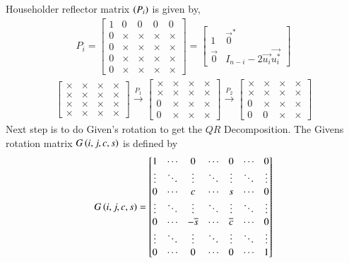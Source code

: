 \documentclass[journal]{IEEEtran}
\begin{document}
\newline
Householder reflector matrix $\left(P_{i}\right)$ is given by,
\begin{align}
  P_{i} = \begin{bmatrix}
    1 & 0 & 0 & 0 & 0\\    
    0 & \times & \times & \times & \times\\
    0 & \times & \times & \times & \times\\
    0 & \times & \times & \times & \times\\
    0 & \times & \times & \times & \times
  \end{bmatrix} = \begin{bmatrix}
    1 & \vec{0}^{\ast}\\    
    \vec{0} & I_{n - i} - 2\vec{u_{i}}\vec{u_{i}^{\ast}}
  \end{bmatrix}
\end{align}
\begin{align}
\begin{bmatrix}
\times & \times & \times & \times \\
\times & \times & \times & \times \\
\times & \times & \times & \times \\
\times & \times & \times & \times
\end{bmatrix}
\xrightarrow{P_1}
\begin{bmatrix}
\times & \times & \times & \times \\
\times & \times & \times & \times \\
0 & \times & \times & \times \\
0 & \times & \times & \times
\end{bmatrix}
\xrightarrow{P_2}
\begin{bmatrix}
\times & \times & \times & \times \\
\times & \times & \times & \times \\
0 & \times & \times & \times \\
0 & 0 & \times & \times
\end{bmatrix}
\end{align}
Next step is to do Given's rotation to get the $QR$ Decomposition.
\newline
The Givens rotation matrix $G\left(i, j, c, s\right)$ is defined by
\begin{align}
G\left(i, j, c, s\right) = \begin{bmatrix}
1 & \cdots & 0 & \cdots & 0 & \cdots & 0 \\
\vdots & \ddots & \vdots & \ddots & \vdots & \ddots & \vdots \\
0 & \cdots & c & \cdots & s & \cdots & 0 \\
\vdots & \ddots & \vdots & \ddots & \vdots & \ddots & \vdots \\
0 & \cdots & -\overline{s} & \cdots & \overline{c} & \cdots & 0 \\
\vdots & \ddots & \vdots & \ddots & \vdots & \ddots & \vdots \\
0 & \cdots & 0 & \cdots & 0 & \cdots & 1
\end{bmatrix}
\end{align}
\end{document}
